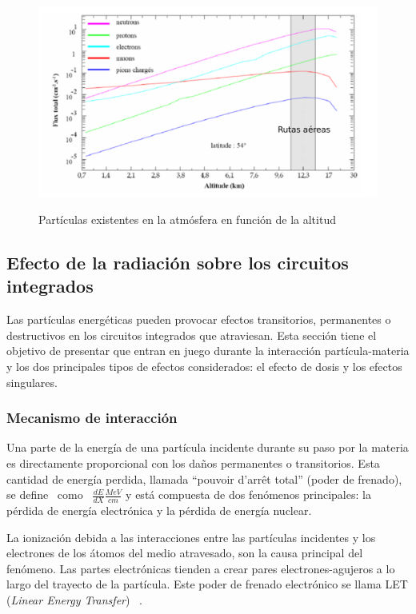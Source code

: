 \documentclass[a4paper,openright,12pt]{report}
\begin{document}
\begin{figure}[H]
	\centering
	\includegraphics[width=1 \textwidth]{img/Alturas.pdf}
	\caption{Partículas existentes en la atmósfera en función de la altitud   }\cite{mansour2012methodes}
	\label{Alturas}
\end{figure}


\subsection{Efecto de la radiación sobre los circuitos integrados }

Las partículas energéticas pueden provocar efectos transitorios, permanentes o destructivos en los circuitos integrados que atraviesan. Esta sección tiene el objetivo de presentar  que entran en juego durante la interacción partícula-materia y los dos principales tipos de efectos considerados: el efecto de dosis y los efectos singulares.

\subsubsection{Mecanismo de interacción }

Una parte de la energía de una partícula incidente durante su paso por la materia es directamente proporcional con los daños permanentes o transitorios. Esta cantidad de energía perdida, llamada ``pouvoir d'arrêt total'' (poder de frenado), se define ~como ~$\frac{dE}{dX} \frac{MeV}{cm}$  y está compuesta de dos fenómenos principales: la pérdida de energía electrónica y la pérdida de energía nuclear.

La ionización debida a las interacciones entre las partículas incidentes y los electrones de los átomos del medio atravesado, son la causa principal del fenómeno. Las partes electrónicas tienden a  crear pares electrones-agujeros a lo largo del trayecto de la partícula. Este poder de frenado electrónico se llama LET (\textit{Linear Energy Transfer}) ~\cite{4395093}.
	
\end{document}
